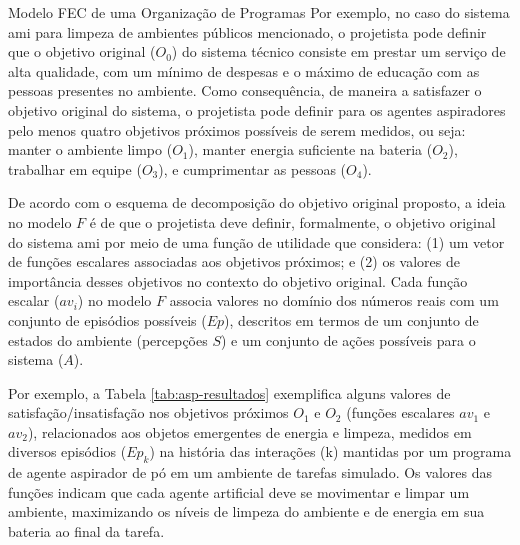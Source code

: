 \begin{section}{Modelo FEC de uma Organização de Programas}
    Por exemplo, no caso do sistema \acrshort{ami} para limpeza de ambientes públicos mencionado, o projetista pode definir que o objetivo original ($O_0$) do sistema técnico consiste em prestar um serviço de alta qualidade, com um mínimo de despesas e o máximo de educação com as pessoas presentes no ambiente. Como consequência, de maneira a satisfazer o objetivo original do sistema, o projetista pode definir para os agentes aspiradores pelo menos quatro objetivos próximos possíveis de serem medidos, ou seja: manter o ambiente limpo ($O_1$), manter energia suficiente na bateria ($O_2$), trabalhar em equipe ($O_3$), e cumprimentar as pessoas ($O_4$).
    
    De acordo com o esquema de decomposição do objetivo original proposto, a ideia no modelo $F$ é de que o projetista deve definir, formalmente, o objetivo original do sistema \acrshort{ami} por meio de uma função de utilidade que considera: (1) um vetor de funções escalares associadas aos objetivos próximos; e (2) os valores de importância desses objetivos no contexto do objetivo original. Cada função escalar ($av_i$) no modelo $F$ associa valores no domínio dos números reais com um conjunto de episódios possíveis ($Ep$), descritos em termos de um conjunto de estados do ambiente (percepções $S$) e um conjunto de ações possíveis para o sistema ($A$).
    
    Por exemplo, a Tabela \ref{tab:asp-resultados} exemplifica alguns valores de satisfação/insatisfação nos objetivos próximos $O_1$ e $O_2$ (funções escalares $av_1$ e $av_2$), relacionados aos objetos emergentes de energia e limpeza, medidos em diversos episódios ($Ep_k$) na história das interações (k) mantidas por um programa de agente aspirador de pó em um ambiente de tarefas simulado. Os valores das funções indicam que cada agente artificial deve se movimentar e limpar um ambiente, maximizando os níveis de limpeza do ambiente e de energia em sua bateria ao final da tarefa.
    

\end{section}
